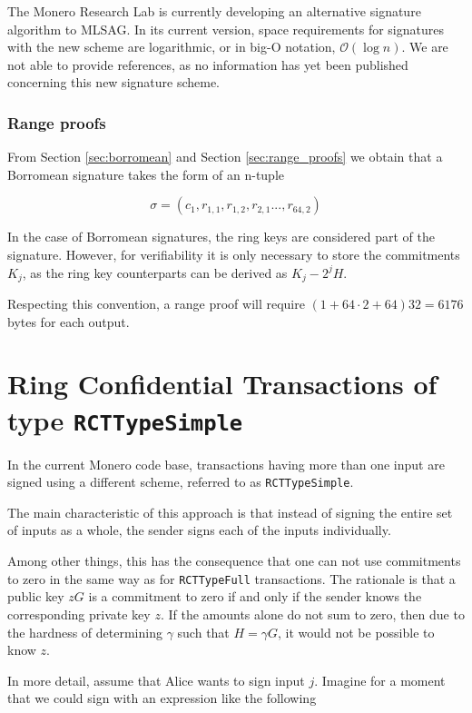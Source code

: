 The Monero Research Lab is currently developing an alternative signature algorithm to MLSAG. 
In its current version, space requirements for signatures with the new scheme are logarithmic, 
or in big-O notation, \(\mathcal{O}(\log n)\).
We are not able to provide references, as no information has yet been published concerning this new signature scheme.


\subsubsection*{Range proofs}
\label{range-proofs-space}

From Section \ref{sec:borromean} and Section \ref{sec:range_proofs} we obtain that a Borromean signature 
takes the form of an n-tuple

\[\sigma = (c_1, r_{1, 1}, r_{1, 2}, r_{2, 1}..., r_{64, 2} )  \]

In the case of Borromean signatures, the ring keys are considered part of the signature.
However, for verifiability it is only necessary to store the commitments \(K_j\), as the
ring key counterparts can be derived as \(K_j - 2^j H\).

Respecting this convention, a range proof will require \( ( 1 + 64 \cdot 2 + 64  ) 32 = 6176\) bytes
for each output.



\section{ Ring Confidential Transactions of type {\tt RCTTypeSimple}}

In the current Monero code base, transactions having more than one input are signed using 
a different scheme, referred to as {\tt RCTTypeSimple}.

The main characteristic of this approach is that instead of signing the entire set of inputs as a whole,
the sender signs each of the inputs individually.

Among other things, this has the consequence that one can not use commitments to zero in the same way as for {\tt RCTTypeFull}
transactions. The rationale is that a public key \(z G\) is a commitment to zero if and only if the sender knows the
corresponding private key \(z\). If the amounts alone do not sum to zero, then due to the hardness of determining
\(\gamma\) such that \(H = \gamma G\),
it would not be possible to know \(z\).

In more detail, assume that Alice  wants to sign input \(j\). 
Imagine for a moment that we could sign with an expression like the following

